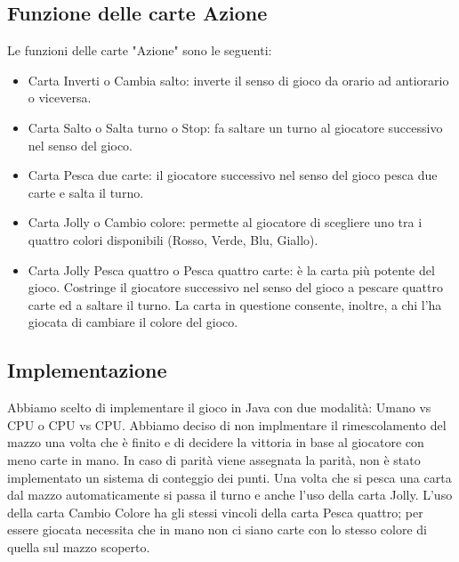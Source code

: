 		\subsection{Funzione delle carte Azione}
			Le funzioni delle carte "Azione" sono le seguenti:
			\begin{itemize}
			\item	Carta Inverti o Cambia salto: inverte il senso di gioco da orario ad antiorario o viceversa.
			\item	Carta Salto o Salta turno o Stop: fa saltare un turno al giocatore successivo nel senso del gioco.
			\item	Carta Pesca due carte: il giocatore successivo nel senso del gioco pesca due carte e salta il turno.
			\item	Carta Jolly o Cambio colore: permette al giocatore di scegliere uno tra i quattro colori disponibili (Rosso, Verde, Blu, Giallo).
			\item	Carta Jolly Pesca quattro o Pesca quattro carte: è la carta più potente del gioco. Costringe il giocatore successivo nel senso del gioco a pescare quattro carte ed a saltare il turno. La carta in questione consente, inoltre, a chi l'ha giocata di cambiare il colore del gioco.
			\end{itemize}
			
		\subsection{Implementazione}	
			Abbiamo scelto di implementare il gioco in Java con due modalità: Umano vs CPU o CPU vs CPU. Abbiamo deciso di non implmentare il rimescolamento del mazzo una volta che è finito e di decidere la vittoria in base al giocatore con meno carte in mano. In caso di parità viene assegnata la parità, non è stato implementato un sistema di conteggio dei punti. Una volta che si pesca una carta dal mazzo automaticamente si passa il turno e anche l'uso della carta Jolly. L'uso della carta Cambio Colore ha gli stessi vincoli della carta Pesca quattro; per essere giocata necessita che in mano non ci siano carte con lo stesso colore di quella sul mazzo scoperto.
			
